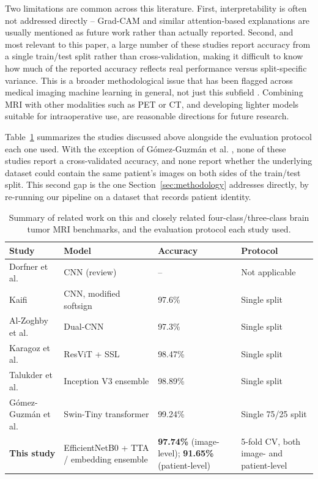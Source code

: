 \documentclass[conference]{IEEEtran}
\begin{document}
Two limitations are common across this literature. First, interpretability is often not addressed directly -- Grad-CAM and similar attention-based explanations are usually mentioned as future work rather than actually reported. Second, and most relevant to this paper, a large number of these studies report accuracy from a single train/test split rather than cross-validation, making it difficult to know how much of the reported accuracy reflects real performance versus split-specific variance. This is a broader methodological issue that has been flagged across medical imaging machine learning in general, not just this subfield \cite{varoquaux2022leakage}. Combining MRI with other modalities such as PET or CT, and developing lighter models suitable for intraoperative use, are reasonable directions for future research.

Table~\ref{tab:related_work} summarizes the studies discussed above alongside the evaluation protocol each one used. With the exception of G\'omez-Guzm\'an et al. \cite{gomezguzman2025swin}, none of these studies report a cross-validated accuracy, and none report whether the underlying dataset could contain the same patient's images on both sides of the train/test split. This second gap is the one Section~\ref{sec:methodology} addresses directly, by re-running our pipeline on a dataset that records patient identity.

\begin{table}[!htbp]
\centering
\caption{Summary of related work on this and closely related four-class/three-class brain tumor MRI benchmarks, and the evaluation protocol each study used.}
\begin{tabular}{|p{1.7cm}|p{1.9cm}|p{1.4cm}|p{2.1cm}|}
\hline
\textbf{Study} & \textbf{Model} & \textbf{Accuracy} & \textbf{Protocol} \\ \hline
Dorfner et al. \cite{r16} & CNN (review) & -- & Not applicable \\ \hline
Kaifi \cite{r17} & CNN, modified softsign & 97.6\% & Single split \\ \hline
Al-Zoghby et al. \cite{r18} & Dual-CNN & 97.3\% & Single split \\ \hline
Karagoz et al. \cite{r19} & ResViT + SSL & 98.47\% & Single split \\ \hline
Talukder et al. \cite{r20} & Inception V3 ensemble & 98.89\% & Single split \\ \hline
G\'omez-Guzm\'an et al. \cite{gomezguzman2025swin} & Swin-Tiny transformer & 99.24\% & Single 75/25 split \\ \hline
\textbf{This study} & EfficientNetB0 + TTA / embedding ensemble & \textbf{97.74\%} (image-level); \textbf{91.65\%} (patient-level) & 5-fold CV, both image- and patient-level \\ \hline
\end{tabular}
\label{tab:related_work}
\end{table}
\end{document}
